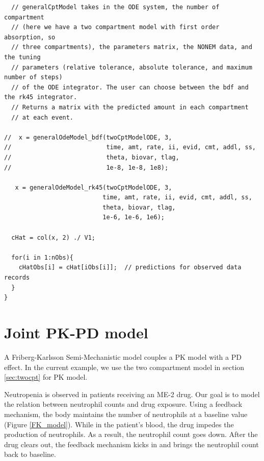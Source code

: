 \documentclass[10pt, reqno, oneside]{amsbook}
\numberwithin{equation}{chapter}
\numberwithin{figure}{chapter}
\numberwithin{table}{chapter}
\theoremstyle{remark}
\begin{document}
\begin{verbatim}
  // generalCptModel takes in the ODE system, the number of compartment 
  // (here we have a two compartment model with first order absorption, so
  // three compartments), the parameters matrix, the NONEM data, and the tuning
  // parameters (relative tolerance, absolute tolerance, and maximum number of steps)
  // of the ODE integrator. The user can choose between the bdf and the rk45 integrator.
  // Returns a matrix with the predicted amount in each compartment 
  // at each event.

//  x = generalOdeModel_bdf(twoCptModelODE, 3,
//                          time, amt, rate, ii, evid, cmt, addl, ss,
//                          theta, biovar, tlag,
//                          1e-8, 1e-8, 1e8);

   x = generalOdeModel_rk45(twoCptModelODE, 3,
                           time, amt, rate, ii, evid, cmt, addl, ss,
                           theta, biovar, tlag,
                           1e-6, 1e-6, 1e6);

  cHat = col(x, 2) ./ V1;

  for(i in 1:nObs){
    cHatObs[i] = cHat[iObs[i]];  // predictions for observed data records
  }
}
\end{verbatim}

\section{Joint PK-PD model}
\label{sec:org2db2d0c}

A Friberg-Karlsson Semi-Mechanistic model \cite{friberg_mechanistic_2003} couples
a PK model with a PD
effect. In the current example, we use the two compartment model in section \ref{sec:twocpt} for
PK model.

Neutropenia is observed in patients receiving an ME-2 drug. Our goal
is to model the relation between neutrophil counts and drug
exposure. Using a feedback mechanism, the body maintains the number of
neutrophils at a baseline value (Figure \ref{FK_model}). While in the
patient's blood, the drug impedes the production of neutrophils. As a
result, the neutrophil count goes down. After the drug clears out, the
feedback mechanism kicks in and brings the neutrophil count back to
baseline.
\end{document}
